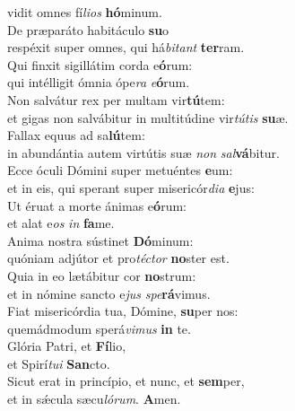 \oddverse vidit omnes fí\textit{li}\textit{os} \textbf{hó}minum.\\
\evenverse De præparáto habitáculo \textbf{su}o~\*\\
\evenverse respéxit super omnes, qui há\textit{bi}\textit{tant} \textbf{ter}ram.\\
\oddverse Qui finxit sigillátim corda e\textbf{ó}rum:~\*\\
\oddverse qui intélligit ómnia ópe\textit{ra} \textit{e}\textbf{ó}rum.\\
\evenverse Non salvátur rex per multam vir\textbf{tú}tem:~\*\\
\evenverse et gigas non salvábitur in multitúdine vir\textit{tú}\textit{tis} \textbf{su}æ.\\
\oddverse Fallax equus ad sa\textbf{lú}tem:~\*\\
\oddverse in abundántia autem virtútis suæ \textit{non} \textit{sal}\textbf{vá}bitur.\\
\evenverse Ecce óculi Dómini super metuéntes \textbf{e}um:~\*\\
\evenverse et in eis, qui sperant super misericór\textit{di}\textit{a} \textbf{e}jus:\\
\oddverse Ut éruat a morte ánimas e\textbf{ó}rum:~\*\\
\oddverse et alat e\textit{os} \textit{in} \textbf{fa}me.\\
\evenverse Anima nostra sústinet \textbf{Dó}minum:~\*\\
\evenverse quóniam adjútor et pro\textit{té}\textit{ctor} \textbf{no}ster est.\\
\oddverse Quia in eo lætábitur cor \textbf{no}strum:~\*\\
\oddverse et in nómine sancto e\textit{jus} \textit{spe}\textbf{rá}vimus.\\
\evenverse Fiat misericórdia tua, Dómine, \textbf{su}per nos:~\*\\
\evenverse quemádmodum sperá\textit{vi}\textit{mus} \textbf{in} te.\\
\oddverse Glória Patri, et \textbf{Fí}lio,~\*\\
\oddverse et Spirí\textit{tu}\textit{i} \textbf{San}cto.\\
\evenverse Sicut erat in princípio, et nunc, et \textbf{sem}per,~\*\\
\evenverse et in sǽcula sæcu\textit{ló}\textit{rum}. \textbf{A}men.\\
